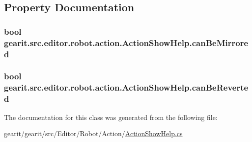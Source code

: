 \subsection{Property Documentation}
\hypertarget{classgearit_1_1src_1_1editor_1_1robot_1_1action_1_1_action_show_help_a69e1229508bb9870baa2e485beda03e6}{
\subsubsection[{can\+Be\+Mirrored}]{\setlength{\rightskip}{0pt plus 5cm}bool gearit.\+src.\+editor.\+robot.\+action.\+Action\+Show\+Help.\+can\+Be\+Mirrored\hspace{0.3cm}{\ttfamily [get]}}}\label{classgearit_1_1src_1_1editor_1_1robot_1_1action_1_1_action_show_help_a69e1229508bb9870baa2e485beda03e6}
\hypertarget{classgearit_1_1src_1_1editor_1_1robot_1_1action_1_1_action_show_help_a60bcb43322fdcba4a9b9416bcdced1c8}{
\subsubsection[{can\+Be\+Reverted}]{\setlength{\rightskip}{0pt plus 5cm}bool gearit.\+src.\+editor.\+robot.\+action.\+Action\+Show\+Help.\+can\+Be\+Reverted\hspace{0.3cm}{\ttfamily [get]}}}\label{classgearit_1_1src_1_1editor_1_1robot_1_1action_1_1_action_show_help_a60bcb43322fdcba4a9b9416bcdced1c8}


The documentation for this class was generated from the following file\+:\begin{DoxyCompactItemize}
\item 
gearit/gearit/src/\+Editor/\+Robot/\+Action/\hyperlink{_robot_2_action_2_action_show_help_8cs}{Action\+Show\+Help.\+cs}\end{DoxyCompactItemize}
